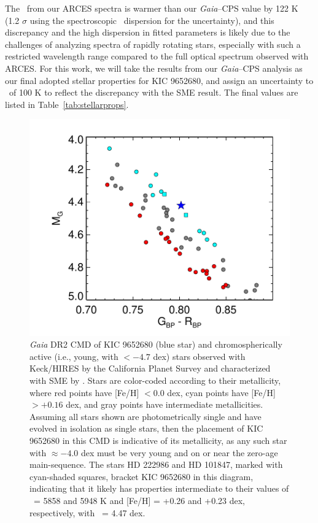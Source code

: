 The \teff\ from our ARCES spectra is warmer than our
\textit{Gaia}--CPS value by 122 K 
(1.2 $\sigma$ using the spectroscopic \teff\ dispersion for the uncertainty), 
and this discrepancy and the high dispersion in fitted parameters 
is likely 
due to the challenges 
of analyzing spectra of 
rapidly rotating stars, 
especially with such a restricted wavelength range 
compared to the full optical spectrum observed with 
ARCES.
For this work, 
we will take the results from our 
\textit{Gaia}--CPS analysis as our 
final adopted stellar properties for KIC 9652680, 
and assign an uncertainty to \teff\ of 100 K to 
reflect the discrepancy with the SME result. 
The final values are listed in Table~\ref{tab:stellarprops}.



\begin{figure}
    \centering
    \includegraphics[scale=0.8]{nephelion/KIC-GCPS-v2.pdf}
    \caption{\textit{Gaia} DR2 CMD of KIC 9652680 (blue star) and chromospherically active (i.e., young, with \logrprime $< -4.7$ dex) stars observed with Keck/HIRES by the California Planet Survey and characterized with SME 
    by \citet{Brewer2016}. 
    Stars are color-coded according to their 
    metallicity, where red points have [Fe/H] $< 0.0$ dex, 
    cyan points have [Fe/H] $> +0.16$ dex,
    and gray points have intermediate metallicities.
    Assuming all stars shown are photometrically single 
    and have evolved in isolation as single stars,
    then the placement of KIC 9652680 in this CMD is indicative of its 
    metallicity, as any such star with \logrprime $\approx -4.0$ dex
    must be very young and on or near the zero-age main-sequence.
    The stars HD 222986 and HD 101847, marked with cyan-shaded squares, 
    bracket KIC 9652680 in this diagram, indicating that it likely has 
    properties intermediate to their values of \teff\ = 5858 and 5948 K 
    and [Fe/H] = +0.26 and +0.23 dex, respectively, with \logg\ = 4.47 dex.}
    \label{fig:CMDkic}
\end{figure}

